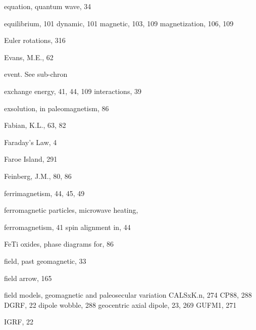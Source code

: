\documentclass[,plain]{tauxe}
\begin{document}
\begin{theindex}
  \item equation, quantum wave, 34
  \item equilibrium, 101
    \subitem dynamic, 101
    \subitem magnetic, 103, 109
    \subitem magnetization, 106, 109
  \item Euler rotations, 316
  \item Evans, M.E., 62
  \item event. See sub-chron
  \item exchange
    \subitem energy, 41, 44, 109
    \subitem interactions, 39
  \item exsolution, in paleomagnetism, 86

  \indexspace

  \item Fabian, K.L., 63, 82
  \item Faraday's Law, 4
  \item Faroe Island, 291
  \item Feinberg, J.M., 80, 86
  \item ferrimagnetism, 44, 45, 49
  \item ferromagnetic particles, microwave heating,
  \item ferromagnetism, 41
    \subitem spin alignment in, 44
  \item FeTi oxides, phase diagrams for, 86
  \item field, past geomagnetic, 33
\item field arrow, 165
  \item field models, geomagnetic and paleosecular variation
  \subitem CALSxK.n, 274    
  \subitem CP88, 288
	\subitem DGRF, 22
    \subitem dipole wobble, 288
    \subitem geocentric axial dipole, 23, 269
    \subitem GUFM1, 271
    
    \subitem IGRF, 22
    

\end{theindex}
\end{document}
